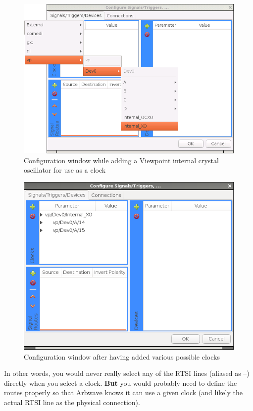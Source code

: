 \begin{figure}[ht]
  \centerline{\includegraphics[width=.5\textwidth]{figures/add-clock-vp-XO}}
  \caption{Configuration window while adding a Viewpoint internal crystal
  oscillator for use as a clock}
  \label{fig:devcfg:add-clock-vp-XO}
\end{figure}

\begin{figure}[ht]
  \centerline{\includegraphics[width=.5\textwidth]{figures/clocks-added}}
  \caption{Configuration window after having added various possible clocks}
  \label{fig:devcfg:clocks-added}
\end{figure}


In other words, you would never really select any of the RTSI lines (aliased as
--) directly when you select a clock.
\textbf{But} you would probably need to define the routes properly so that
Arbwave knows it can use a given clock (and likely the actual RTSI line as the
physical connection).

